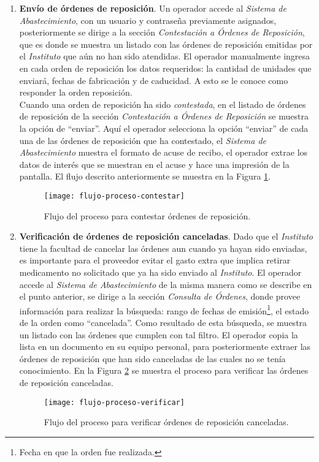 \begin{enumerate}
\item \textbf{Envío de órdenes de reposición}. Un operador accede al \textit{Sistema de Abastecimiento}, con un usuario y contraseña previamente asignados, posteriormente se dirige a la sección \textit{Contestación a Órdenes de Reposición}, que es donde se muestra un listado con las órdenes de reposición emitidas por el \textit{Instituto} que aún no han sido atendidas. El operador manualmente ingresa en cada orden de reposición los datos requeridos: la cantidad de unidades que enviará, fechas de fabricación y de caducidad. A esto se le conoce como responder la orden reposición.\\
Cuando una orden de reposición ha sido \textit{contestada}, en el listado de órdenes de reposición de la sección \textit{Contestación a Órdenes de Reposición} se muestra la opción de ``enviar''. Aquí el operador selecciona la opción ``enviar'' de cada una de las órdenes de reposición que ha contestado, el \textit{Sistema de Abastecimiento} muestra el formato de acuse de recibo, el operador extrae los datos de interés que se muestran en el acuse y hace una impresión de la pantalla. El flujo descrito anteriormente se muestra en la Figura \ref{fig:flow-proc-contestar}.

\begin{figure}[H]
\centering
\texttt{[image: flujo-proceso-contestar]} 
\caption{Flujo del proceso para contestar órdenes de reposición.}
\label{fig:flow-proc-contestar}
\end{figure}

\item \textbf{Verificación de órdenes de reposición canceladas}. Dado que el \textit{Instituto} tiene la facultad de cancelar las órdenes aun cuando ya hayan sido enviadas, es importante para el proveedor evitar el gasto extra que implica retirar medicamento no solicitado que ya ha sido enviado al \textit{Instituto}. El operador accede al \textit{Sistema de Abastecimiento} de la misma manera como se describe en el punto anterior, se dirige a la sección \textit{Consulta de Órdenes}, donde provee información para realizar la búsqueda: rango de fechas de emisión\footnote{Fecha en que la orden fue realizada.}, el estado de la orden como ``cancelada''. Como resultado de esta búsqueda, se muestra un listado con las órdenes que cumplen con tal filtro. El operador copia la lista en un documento en su equipo personal, para posteriormente extraer las órdenes de reposición que han sido canceladas de las cuales no se tenía conocimiento. En la Figura \ref{fig:flow-proc-verificar} se muestra el proceso para verificar las órdenes de reposición canceladas.
\begin{figure}[H]
\centering
\texttt{[image: flujo-proceso-verificar]} 
\caption{Flujo del proceso para verificar órdenes de reposición canceladas.}
\label{fig:flow-proc-verificar}
\end{figure}
\end{enumerate}

